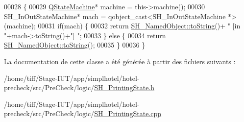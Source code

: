 \begin{DoxyCode}
00028 \{
00029     \hyperlink{classQStateMachine}{QStateMachine}* machine = this->machine();
00030     SH\_InOutStateMachine* mach = qobject\_cast<SH\_InOutStateMachine *>(machine);
00031     \textcolor{keywordflow}{if}(mach) \{
00032         \textcolor{keywordflow}{return} \hyperlink{classSimpleHotel_1_1SH__NamedObject_ab6e289aeff50c3fb0f30156c68b1e808}{SH\_NamedObject::toString}()+ \textcolor{stringliteral}{" [in "}+mach->toString()+\textcolor{stringliteral}{"] "};
00033     \} \textcolor{keywordflow}{else} \{
00034         \textcolor{keywordflow}{return} \hyperlink{classSimpleHotel_1_1SH__NamedObject_ab6e289aeff50c3fb0f30156c68b1e808}{SH\_NamedObject::toString}();
00035     \}
00036 \}
\end{DoxyCode}


La documentation de cette classe a été générée à partir des fichiers suivants \-:\begin{DoxyCompactItemize}
\item 
/home/tiff/\-Stage-\/\-I\-U\-T/app/simplhotel/hotel-\/precheck/src/\-Pre\-Check/logic/\hyperlink{SH__PrintingState_8h}{S\-H\-\_\-\-Printing\-State.\-h}\item 
/home/tiff/\-Stage-\/\-I\-U\-T/app/simplhotel/hotel-\/precheck/src/\-Pre\-Check/logic/\hyperlink{SH__PrintingState_8cpp}{S\-H\-\_\-\-Printing\-State.\-cpp}\end{DoxyCompactItemize}
